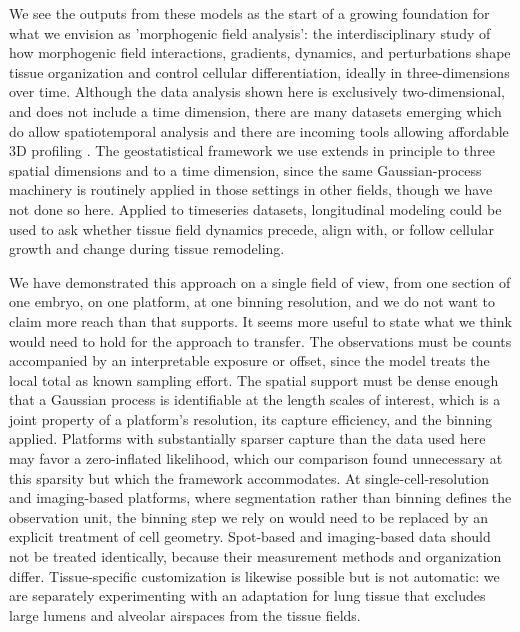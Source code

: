 \documentclass[10pt,letterpaper]{article}
\begin{document}
We see the outputs from these models as the start of a growing foundation for what we envision as 'morphogenic field analysis': the interdisciplinary study of how morphogenic field interactions, gradients, dynamics, and perturbations shape tissue organization and control cellular differentiation, ideally in three-dimensions over time. Although the data analysis shown here is exclusively two-dimensional, and does not include a time dimension, there are many datasets emerging which do allow spatiotemporal analysis and there are incoming tools allowing affordable 3D profiling \cite{Reynolds2025}. The geostatistical framework we use extends in principle to three spatial dimensions and to a time dimension, since the same Gaussian-process machinery is routinely applied in those settings in other fields, though we have not done so here. Applied to timeseries datasets, longitudinal modeling could be used to ask whether tissue field dynamics precede, align with, or follow cellular growth and change during tissue remodeling.

We have demonstrated this approach on a single field of view, from one section of one embryo, on one platform, at one binning resolution, and we do not want to claim more reach than that supports. It seems more useful to state what we think would need to hold for the approach to transfer. The observations must be counts accompanied by an interpretable exposure or offset, since the model treats the local total as known sampling effort. The spatial support must be dense enough that a Gaussian process is identifiable at the length scales of interest, which is a joint property of a platform's resolution, its capture efficiency, and the binning applied. Platforms with substantially sparser capture than the data used here may favor a zero-inflated likelihood, which our comparison found unnecessary at this sparsity but which the framework accommodates. At single-cell-resolution and imaging-based platforms, where segmentation rather than binning defines the observation unit, the binning step we rely on would need to be replaced by an explicit treatment of cell geometry. Spot-based and imaging-based data should not be treated identically, because their measurement methods and organization differ. Tissue-specific customization is likewise possible but is not automatic: we are separately experimenting with an adaptation for lung tissue that excludes large lumens and alveolar airspaces from the tissue fields.
\end{document}
